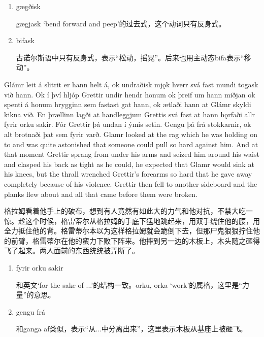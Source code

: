 \begin{grammar*}{}
    \begin{enumerate}[leftmargin=*]
        \item gægðisk

              gægjask `bend forward and peep'的过去式，这个动词只有反身式。

        \item bifask

              古诺尔斯语中只有反身式，表示“松动，摇晃”。后来也用主动态bifa表示“移动”。
    \end{enumerate}
\end{grammar*}
\begin{paracol}{2}
    Glámr leit á slitrit er hann helt á, ok undraðisk mjǫk hverr svá fast mundi togask við hann. Ok í því hljóp Grettir undir hendr honum ok þreif um hann miðjan ok spenti á honum hrygginn sem fastast gat hann, ok ætlaði hann at Glámr skyldi kikna við. En þrællinn lagði at handleggjum Grettis svá fast at hann hǫrfaði allr fyrir orku sakir. Fór Grettir þá undan í ýmis setin. Gengu þá frá stokkarnir, ok alt brotnaði þat sem fyrir varð.
    \switchcolumn
    Glamr looked at the rag which he was holding on to and was quite astonished that someone could pull so hard against him. And at that moment Grettir sprang from under his arms and seized him around his waist and clasped his back as tight as he could, he expected that Glamr would sink at his knees, but the thrall wrenched Grettir's forearms so hard that he gave away completely because of his violence. Grettir then fell to another sideboard and the planks flew about and all that came before them were broken.
\end{paracol}
\begin{translation*}{}
    格拉姆看着他手上的破布，想到有人竟然有如此大的力气和他对抗，不禁大吃一惊。趁这个时候，格雷蒂尔从格拉姆的手底下猛地跳起来，用双手绕住他的腰，用全力抵住他的背。格雷蒂尔本以为这样格拉姆就会跪倒下去，但那尸鬼狠狠拧住他的前臂，格雷蒂尔在他的蛮力下败下阵来。他摔到另一边的木板上，木头随之砸得飞了起来。两人面前的东西统统被弄断了。
\end{translation*}
\begin{grammar*}{}
    \begin{enumerate}[leftmargin=*]
        \item fyrir orku sakir

              和英文`for the sake of ...'的结构一致。orku, orka `work'的属格，这里是“力量”的意思。

        \item gengu frá

              和ganga af类似，表示“从...中分离出来”，这里表示木板从基座上被砸飞。
    \end{enumerate}
\end{grammar*}
